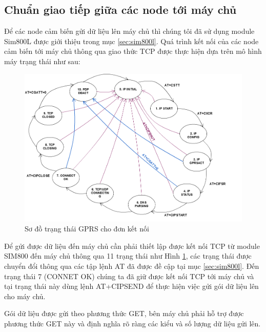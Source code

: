 \newpage


\subsection{Chuẩn giao tiếp giữa các node tới máy chủ}
Để các node cảm biến gửi dữ liệu lên máy chủ thì chúng tôi đã sử dụng module Sim800L được giới thiệu trong mục \ref{sec:sim800l}. Quá trình kết nối của các node cảm biến tới máy chủ thông qua giao thức TCP được thực hiện dựa trên mô hình máy trạng thái như sau:


\begin{figure}[H]
\centering   
\includegraphics[width=1\textwidth]{sim800_status}
\caption[Sơ đồ trạng thái GPRS cho đơn kết nối]{Sơ đồ trạng thái GPRS cho đơn kết nối}
\label{fig:sim800_status}
\end{figure}

Để gửi được dữ liệu đến máy chủ cần phải thiết lập được kết nối TCP từ module SIM800 đến máy chủ thông qua 11 trạng thái như Hình \ref{fig:sim800_status}, các trạng thái được chuyển đổi thông qua các tập lệnh AT đã được đề cập tại mục \ref{sec:sim800l}. Đến trạng thái 7 (CONNET OK) chúng ta đã giữ được kết nối TCP tới máy chủ và tại trạng thái này dùng lệnh AT+CIPSEND để thực hiện việc gửi gói dữ liệu lên cho máy chủ.

Gói dữ liệu được gửi theo phương thức GET, bên máy chủ phải hỗ trợ được phương thức GET này và định nghĩa rõ ràng các kiểu và số lượng dữ liệu gửi lên. 

